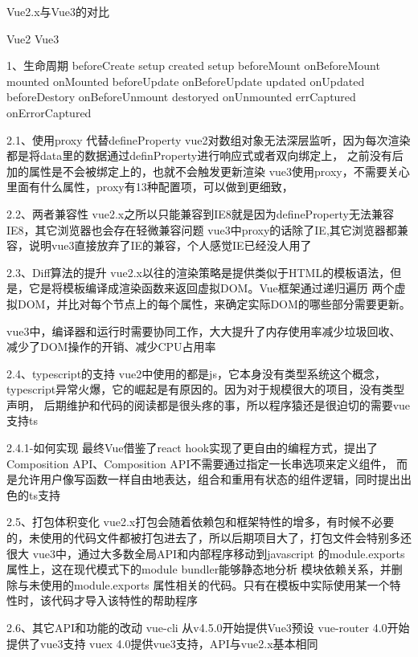 Vue2.x与Vue3的对比

Vue2                                Vue3

1、生命周期
beforeCreate                        setup
created                             setup
beforeMount                         onBeforeMount
mounted                             onMounted
beforeUpdate                        onBeforeUpdate
updated                             onUpdated
beforeDestory                       onBeforeUnmount
destoryed                           onUnmounted
errCaptured                         onErrorCaptured

2.1、使用proxy 代替defineProperty
vue2对数组对象无法深层监听，因为每次渲染都是将data里的数据通过definProperty进行响应式或者双向绑定上，
之前没有后加的属性是不会被绑定上的，也就不会触发更新渲染
vue3使用proxy，不需要关心里面有什么属性，proxy有13种配置项，可以做到更细致，

2.2、两者兼容性
vue2.x之所以只能兼容到IE8就是因为defineProperty无法兼容IE8，其它浏览器也会存在轻微兼容问题
vue3中proxy的话除了IE,其它浏览器都兼容，说明vue3直接放弃了IE的兼容，个人感觉IE已经没人用了

2.3、Diff算法的提升
vue2.x以往的渲染策略是提供类似于HTML的模板语法，但是，它是将模板编译成渲染函数来返回虚拟DOM。Vue框架通过递归遍历
两个虚拟DOM，并比对每个节点上的每个属性，来确定实际DOM的哪些部分需要更新。

vue3中，编译器和运行时需要协同工作，大大提升了内存使用率减少垃圾回收、减少了DOM操作的开销、减少CPU占用率


2.4、typescript的支持
vue2中使用的都是js，它本身没有类型系统这个概念，typescript异常火爆，它的崛起是有原因的。因为对于规模很大的项目，没有类型声明，
后期维护和代码的阅读都是很头疼的事，所以程序猿还是很迫切的需要vue支持ts

2.4.1-如何实现
最终Vue借鉴了react hook实现了更自由的编程方式，提出了Composition API、Composition API不需要通过指定一长串选项来定义组件，
而是允许用户像写函数一样自由地表达，组合和重用有状态的组件逻辑，同时提出出色的ts支持


2.5、打包体积变化
vue2.x打包会随着依赖包和框架特性的增多，有时候不必要的，未使用的代码文件都被打包进去了，所以后期项目大了，打包文件会特别多还很大
vue3中，通过大多数全局API和内部程序移动到javascript 的module.exports属性上，这在现代模式下的module bundler能够静态地分析
模块依赖关系，并删除与未使用的module.exports 属性相关的代码。只有在模板中实际使用某一个特性时，该代码才导入该特性的帮助程序

2.6、其它API和功能的改动
vue-cli 从v4.5.0开始提供Vue3预设
vue-router 4.0开始提供了vue3支持
vuex 4.0提供vue3支持，API与vue2.x基本相同


